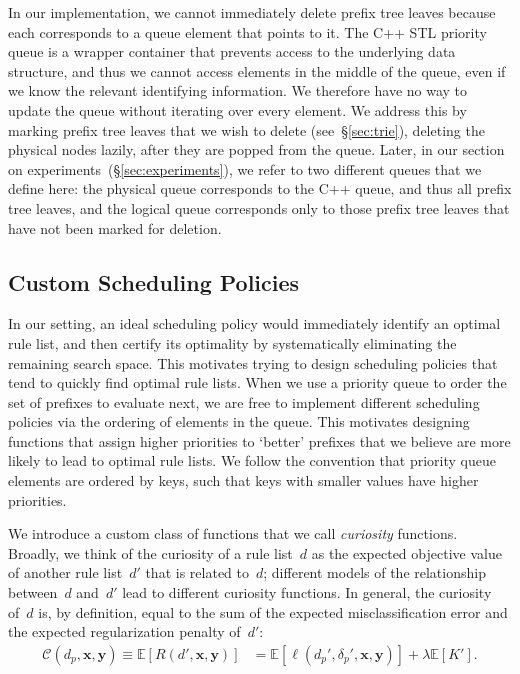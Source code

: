 \documentclass[twoside,11pt]{article}
\def\E{\mathbb{E}}
\newcommand{\x}{\mathbf{x}}
\newcommand{\y}{\mathbf{y}}
\def\RL{{d}}
\def\Prefix{d_p}
\def\Labels{\delta_p}
\def\Obj{R}
\def\Loss{\ell}
\def\Reg{{\lambda}}
\def\Curiosity{\mathcal{C}}
\begin{document}
In our implementation, we cannot immediately delete prefix tree leaves
because each corresponds to a queue element that points to it.
%
The C++ STL priority queue is a wrapper container that prevents access to the
underlying data structure, and thus we cannot access elements in the middle of the queue,
even if we know the relevant identifying information.
%
We therefore have no way to update the queue without iterating over every element.
%
We address this by marking prefix tree leaves that we wish to delete (see~\S\ref{sec:trie}),
deleting the physical nodes lazily, after they are popped from the queue.
%
Later, in our section on experiments~(\S\ref{sec:experiments}),
we refer to two different queues that we define here: the physical queue
corresponds to the C++ queue, and thus all prefix tree leaves, and the logical queue
corresponds only to those prefix tree leaves that have not been marked for deletion.

\subsection{Custom Scheduling Policies}
\label{sec:scheduling}

In our setting, an ideal scheduling policy would immediately identify an optimal
rule list, and then certify its optimality by systematically eliminating the
remaining search space.
%
This motivates trying to design scheduling policies that tend to quickly find optimal rule lists.
%
When we use a priority queue to order the set of prefixes to evaluate next,
we are free to implement different scheduling policies via the ordering of
elements in the queue.
%
This motivates designing functions that assign higher priorities to `better'
prefixes that we believe are more likely to lead to optimal rule lists.
%
We follow the convention that priority queue elements are ordered
by keys, such that keys with smaller values have higher priorities.

We introduce a custom class of functions that we call \emph{curiosity} functions.
%
Broadly, we think of the curiosity of a rule list~$\RL$
as the expected objective value of another rule list~$\RL'$ that is related to~$\RL$;
different models of the relationship between~$\RL$ and~$\RL'$ lead to different
curiosity functions.
%
In general, the curiosity of~$\RL$ is, by definition, equal to the sum of the expected
misclassification error and the expected regularization penalty of~$\RL'$:
\begin{align}
\Curiosity(\Prefix, \x, \y) \equiv \E[ \Obj(\RL', \x, \y) ]
&= \E[\Loss(\Prefix', \Labels', \x, \y)] + \Reg \E[ K' ].
\label{eq:curiosity}
\end{align}
\end{document}
